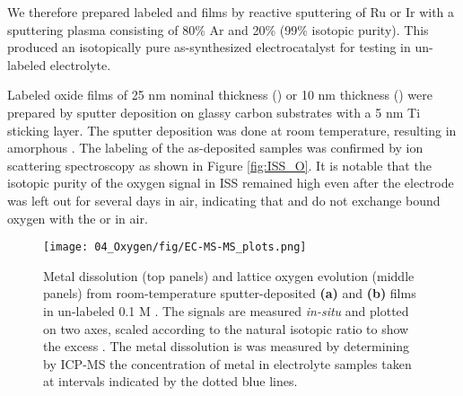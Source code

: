 We therefore prepared labeled  and  films by reactive sputtering of Ru or Ir with a sputtering plasma consisting of 80\% Ar and 20\%  (99\% isotopic purity). This produced an isotopically pure as-synthesized electrocatalyst for testing in un-labeled electrolyte.

Labeled oxide films of 25 nm nominal thickness () or 10 nm thickness () were prepared by sputter deposition on glassy carbon substrates with a 5 nm Ti sticking layer. The sputter deposition was done at room temperature, resulting in amorphous . The labeling of the as-deposited samples was confirmed by ion scattering spectroscopy as shown in Figure \ref{fig:ISS_O}. It is notable that the isotopic purity of the oxygen signal in ISS remained high even after the electrode was left out for several days in air, indicating that  and  do not exchange bound oxygen with the  or  in air.

\begin{figure}[b!]
	\texttt{[image: 04\_Oxygen/fig/EC-MS-MS\_plots.png]}
	\caption{Metal dissolution (top panels) and lattice oxygen evolution (middle panels) from room-temperature sputter-deposited \textbf{(a)}  and \textbf{(b)}  films in un-labeled 0.1 M . The  signals are measured \textit{in-situ} and plotted on two axes, scaled according to the natural isotopic ratio to show the excess . The metal dissolution is was measured by determining by ICP-MS the concentration of metal in electrolyte samples taken at intervals indicated by the dotted blue lines.} 
	\label{fig:EC-MS-MS_plots}
\end{figure}

